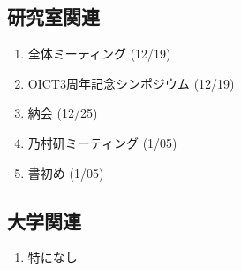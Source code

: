 \documentclass[fleqn, 14pt]{extarticle}
\begin{document}
\subsection{研究室関連}
\label{sec-4-2}

\begin{enumerate}


\item 全体ミーティング
\hfill
\label{enum-12}
(12/19)

\item OICT3周年記念シンポジウム
\hfill
\label{enum-13}
(12/19)

\item 納会
\hfill
\label{enum-14}
(12/25)

\item 乃村研ミーティング
\hfill
\label{enum-15}
(1/05)

\item 書初め 
\hfill
\label{enum-16}
(1/05)

\end{enumerate}

\subsection{大学関連}
\begin{enumerate}
\item 特になし
\end{enumerate}
\end{document}

